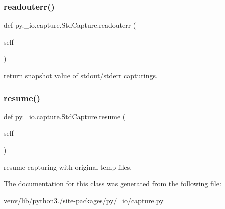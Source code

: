 \subsubsection{\texorpdfstring{readouterr()}{readouterr()}}
{\footnotesize\ttfamily def py.\+\_\+io.\+capture.\+Std\+Capture.\+readouterr (\begin{DoxyParamCaption}\item[{}]{self }\end{DoxyParamCaption})}

\begin{DoxyVerb}return snapshot value of stdout/stderr capturings. \end{DoxyVerb}
 \mbox{\label{classpy_1_1__io_1_1capture_1_1_std_capture_a06868768c8650fe4dbbf8838e3eeab73}} 
\subsubsection{\texorpdfstring{resume()}{resume()}}
{\footnotesize\ttfamily def py.\+\_\+io.\+capture.\+Std\+Capture.\+resume (\begin{DoxyParamCaption}\item[{}]{self }\end{DoxyParamCaption})}

\begin{DoxyVerb}resume capturing with original temp files. \end{DoxyVerb}
 

The documentation for this class was generated from the following file\+:\begin{DoxyCompactItemize}
\item 
venv/lib/python3./site-\/packages/py/\+\_\+io/capture.\+py\end{DoxyCompactItemize}

